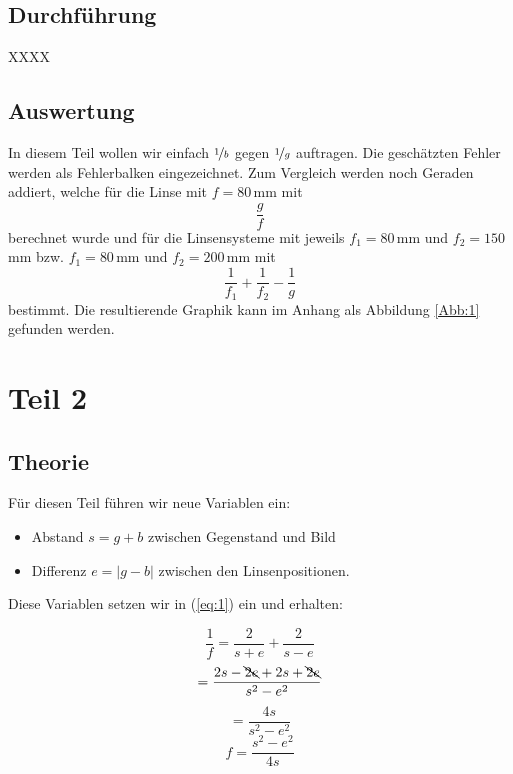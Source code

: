 \documentclass[11pt,a4paper]{article}
\newcommand{\halftime}[4]{\begin{figure}[h]
\begin{minipage}{.#1\textwidth}#3\end{minipage}\begin{minipage}{.#2\textwidth}
\centering
#4\end{minipage}
\end{figure}}
\begin{document}


\subsection{Durchführung}

XXXX

\subsection{Auswertung}

In diesem Teil wollen wir einfach $\nicefrac{1}{b}$ gegen $\nicefrac{1}{g}$ auftragen. Die gesch\"atzten Fehler werden als Fehlerbalken eingezeichnet. Zum Vergleich werden noch Geraden addiert, welche f\"ur die Linse mit $f=80\,$mm mit
\[
\frac{g}{f}
\]
berechnet wurde und f\"ur die Linsensysteme mit jeweils $f_1=80\,$mm und $f_2=150\,$mm bzw. $f_1=80\,$mm und $f_2=200\,$mm mit
\[
\frac{1}{f_1}+\frac{1}{f_2}-\frac{1}{g}
\]
bestimmt. Die resultierende Graphik kann im Anhang als Abbildung \ref{Abb:1} gefunden werden.

\section{Teil 2}

\subsection{Theorie}

F\"ur diesen Teil f\"uhren wir neue Variablen ein:
\begin{itemize}
\item Abstand $s=g+b$ zwischen Gegenstand und Bild
\item Differenz $e=|g-b|$ zwischen den Linsenpositionen.
\end{itemize}

Diese Variablen setzen wir in (\ref{eq:1}) ein und erhalten:

\[
\frac{1}{f}=\frac{2}{s+e}+\frac{2}{s-e}
\]
\[
=\frac{2s-\bcancel{2e}+2s+\bcancel{2e}}{s^2-e^2}
\]
\[=\frac{4s}{s^2-e^2}\]
\begin{equation}
f=\frac{s^2-e^2}{4s}\label{eq:3}
\end{equation}
\end{document}
